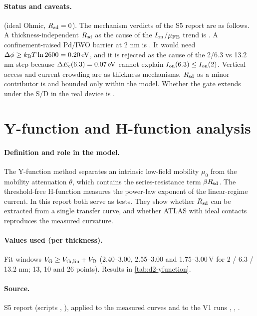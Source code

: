 \paragraph{Status and caveats.}
 (ideal Ohmic, $R_{\mathrm{sd}}=0$). The mechanism verdicts of the S5 report are as follows. A thickness-independent $R_{\mathrm{sd}}$ as the cause of the $I_{\mathrm{on}}$/$\mu_{\mathrm{FE}}$ trend is .
A confinement-raised Pd/IWO barrier at 2 nm is . It would need $\Delta\phi\ge k_{\mathrm{B}}T\ln2600=\SI{0.20}{eV}$, and it is rejected as the cause of the 2/6.3 vs 13.2 nm step because $\Delta E_{\mathrm{c}}(6.3)=\SI{0.07}{eV}$ cannot explain $I_{\mathrm{on}}(6.3)\le I_{\mathrm{on}}(2)$.
Vertical access and current crowding are  as thickness mechanisms.
$R_{\mathrm{sd}}$ as a minor contributor is  and bounded only within the model. Whether the gate extends under the S/D in the real device is .

\section{Y-function and H-function analysis}\label{sec:der-yfunction}

\paragraph{Definition and role in the model.}
The Y-function method separates an intrinsic low-field mobility $\mu_0$ from the mobility attenuation $\theta$, which contains the series-resistance term $\beta R_{\mathrm{sd}}$. The threshold-free H-function measures the power-law exponent of the linear-regime current. In this report both serve as tests. They show whether $R_{\mathrm{sd}}$ can be extracted from a single transfer curve, and whether ATLAS with ideal contacts reproduces the measured curvature.

\paragraph{Values used (per thickness).}
Fit windows $V_{\mathrm{G}}\ge V_{\mathrm{th,lin}}+V_{\mathrm{D}}$ (2.40--3.00, 2.55--3.00 and 1.75--3.00\,V for 2 / 6.3 / 13.2 nm; 13, 10 and 26 points). Results in \cref{tab:d2-yfunction}.

\paragraph{Source.}
S5 report (scripts , ), applied to the measured curves and to the V1 runs , , .

